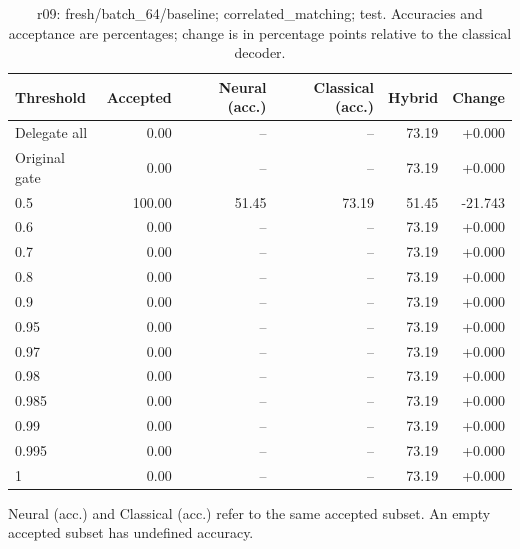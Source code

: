 \begin{table}[htbp]
\centering\small
\setlength{\tabcolsep}{3pt}
\caption{r09: fresh/batch\_64/baseline; correlated\_matching; test. Accuracies and acceptance are percentages; change is in percentage points relative to the classical decoder.}
\begin{tabular}{lrrrrr}
\toprule
Threshold & Accepted & Neural (acc.) & Classical (acc.) & Hybrid & Change \\
\midrule
Delegate all & 0.00 & -- & -- & 73.19 & +0.000 \\
Original gate & 0.00 & -- & -- & 73.19 & +0.000 \\
0.5 & 100.00 & 51.45 & 73.19 & 51.45 & -21.743 \\
0.6 & 0.00 & -- & -- & 73.19 & +0.000 \\
0.7 & 0.00 & -- & -- & 73.19 & +0.000 \\
0.8 & 0.00 & -- & -- & 73.19 & +0.000 \\
0.9 & 0.00 & -- & -- & 73.19 & +0.000 \\
0.95 & 0.00 & -- & -- & 73.19 & +0.000 \\
0.97 & 0.00 & -- & -- & 73.19 & +0.000 \\
0.98 & 0.00 & -- & -- & 73.19 & +0.000 \\
0.985 & 0.00 & -- & -- & 73.19 & +0.000 \\
0.99 & 0.00 & -- & -- & 73.19 & +0.000 \\
0.995 & 0.00 & -- & -- & 73.19 & +0.000 \\
1 & 0.00 & -- & -- & 73.19 & +0.000 \\
\bottomrule
\end{tabular}
\par\smallskip\footnotesize Neural (acc.) and Classical (acc.) refer to the same accepted subset. An empty accepted subset has undefined accuracy.
\end{table}
